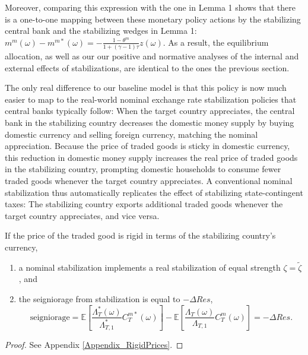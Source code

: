 \documentclass[12pt,letter]{article}
\theoremstyle{break} \theorembodyfont{\normalfont\itshape}
\theoremstyle{break}
\theoremstyle{break} \theorembodyfont{\normalfont\itshape}
\theoremstyle{break} \theorembodyfont{\normalfont\itshape}
\begin{document}
Moreover, comparing this expression with the one in Lemma 1 shows that
there is a one-to-one mapping between these monetary policy actions by
the stabilizing central bank and the stabilizing wedges in Lemma 1:
$ m^m(\omega) - m^{m \ast}(\omega) = - \frac{1 - \theta^m}{1 + (\gamma
  - 1) \tau} z(\omega).$ As a result, the equilibrium allocation, as
well as our our positive and normative analyses of the internal and
external effects of stabilizations, are identical to the ones the
previous section.

The only real difference to our baseline model is that this policy is
now much easier to map to the real-world nominal exchange rate
stabilization policies that central banks typically follow: When the
target country appreciates, the central bank in the stabilizing
country decreases the domestic money supply by buying domestic
currency and selling foreign currency, matching the nominal
appreciation. Because the price of traded goods is sticky in domestic
currency, this reduction in domestic money supply increases the real
price of traded goods in the stabilizing country, prompting domestic
households to consume fewer traded goods whenever the target country
appreciates. A conventional nominal stabilization thus automatically
replicates the effect of stabilizing state-contingent taxes: The
stabilizing country exports additional traded goods whenever the
target country appreciates, and vice versa.

 

\begin{prop}
  If the price of the traded good is rigid in terms of the stabilizing
  country's currency,
  \begin{enumerate}
  \item a nominal stabilization implements a real stabilization of
    equal strength \(\zeta=\tilde{\zeta}\), and
  \item the seigniorage from stabilization is equal to $- \Delta Res$,
    \begin{equation*}
      \text{seigniorage} = 
      \mathbb{E}\left[ \frac{\Lambda^{\ast}_T(\omega)}{\Lambda^{\ast}_{T, 1}} 
        C^{m \ast}_T(\omega) \right] -
      \mathbb{E}\left[ \frac{\Lambda_T(\omega)}{\Lambda_{T, 1}} 
        C^{m}_T(\omega) \right] 
      = - \Delta Res.
    \end{equation*}
  \end{enumerate}
  \label{prop:nominal}
\end{prop}
\begin{proof}
  See Appendix \ref{Appendix_RigidPrices}.
\end{proof}
\end{document}
